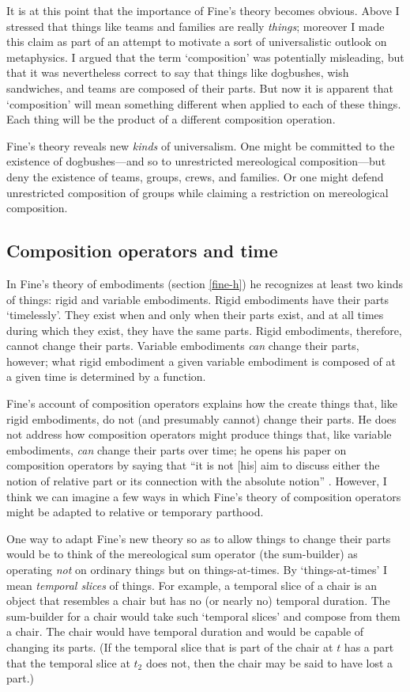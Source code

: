 \documentclass[11pt]{article}
\begin{document}
\begin{spacing}{1.5}
It is at this point that the importance of Fine's theory becomes
obvious.  Above I stressed that things like teams and families are
really {\em things}; moreover I made this claim as part of an attempt
to motivate a sort of universalistic outlook on metaphysics.  I argued
that the term `composition' was potentially misleading, but that it
was nevertheless correct to say that things like dogbushes, wish
sandwiches, and teams are composed of their parts.  But now it is
apparent that `composition' will mean something different when applied
to each of these things.  Each thing will be the product of a
different composition operation.

Fine's theory reveals new {\em kinds} of universalism.  One might be
committed to the existence of dogbushes---and so to unrestricted
mereological composition---but deny the existence of teams, groups,
crews, and families.  Or one might defend unrestricted composition of
groups while claiming a restriction on mereological composition.

\subsection{Composition operators and time}
\label{c-change}
In Fine's theory of embodiments (section \ref{fine-h}) he recognizes
at least two kinds of things: rigid and variable embodiments.  Rigid
embodiments have their parts `timelessly'.  They exist when and only
when their parts exist, and at all times during which they exist, they
have the same parts.  Rigid embodiments, therefore, cannot change
their parts.  Variable embodiments {\em can} change their parts,
however; what rigid embodiment a given variable embodiment is composed
of at a given time is determined by a function.

Fine's account of composition operators explains how the create things
that, like rigid embodiments, do not (and presumably cannot) change
their parts.  He does not address how composition operators might
produce things that, like variable embodiments, {\em can} change their
parts over time; he opens his paper on composition operators by saying
that ``it is not [his] aim to discuss either the notion of relative
part or its connection with the absolute notion''
\citeyearpar[559]{fine2010}.  However, I think we can imagine a few
ways in which Fine's theory of composition operators might be adapted
to relative or temporary parthood.

One way to adapt Fine's new theory so as to allow things to change
their parts would be to think of the mereological sum operator (the
sum-builder) as operating {\em not} on ordinary things but on
things-at-times.  By `things-at-times' I mean {\em temporal slices} of
things.  For example, a temporal slice of a chair is an object that
resembles a chair but has no (or nearly no) temporal duration.  The
sum-builder for a chair would take such `temporal slices' and compose
from them a chair.  The chair would have temporal duration and would
be capable of changing its parts.  (If the temporal slice that is part
of the chair at $t$ has a part that the temporal slice at $t_2$ does
not, then the chair may be said to have lost a part.)


\end{spacing}
\end{document}
